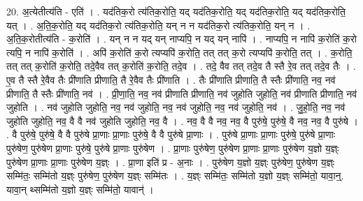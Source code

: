 \documentclass[17pt]{extarticle}
\begin{document}
20. अ॒त्येतीत्य॑ति - एति॑ । . यद॑तिक॒रो त्य॑तिक॒रोति॒ यद् यद॑तिक॒रोति॒ यद् यद॑तिक॒रोति॒ यद् यद॑तिक॒रोति॒ यत् । . अ॒ति॒क॒रोति॒ यद् यद॑तिक॒रो त्य॑तिक॒रोति॒ यन् न न यद॑तिक॒रो त्य॑तिक॒रोति॒ यन् न । . अ॒ति॒क॒रोतीत्य॑ति - क॒रोति॑ । . यन् न न यद् यन् नाप्यपि॒ न यद् यन् नापि॑ । . नाप्यपि॒ न नापि॑ क॒रोति॑ क॒रो त्यपि॒ न नापि॑ क॒रोति॑ । . अपि॑ क॒रोति॑ क॒रो त्यप्यपि॑ क॒रोति॒ तत् तत् क॒रो त्यप्यपि॑ क॒रोति॒ तत् । . क॒रोति॒ तत् तत् क॒रोति॑ क॒रोति॒ तदे॒वैव तत् क॒रोति॑ क॒रोति॒ तदे॒व । . तदे॒ वैव तत् तदे॒व तै स्तै रे॒व तत् तदे॒व तैः । . ए॒व तै स्तै रे॒वैव तैः प्री॑णाति प्रीणाति॒ तै रे॒वैव तैः प्री॑णाति । . तैः प्री॑णाति प्रीणाति॒ तै स्तैः प्री॑णाति॒ नव॒ नव॑ प्रीणाति॒ तै स्तैः प्री॑णाति॒ नव॑ । . प्री॒णा॒ति॒ नव॒ नव॑ प्रीणाति प्रीणाति॒ नव॑ जुहोति जुहोति॒ नव॑ प्रीणाति प्रीणाति॒ नव॑ जुहोति । . नव॑ जुहोति जुहोति॒ नव॒ नव॑ जुहोति॒ नव॒ नव॑ जुहोति॒ नव॒ नव॑ जुहोति॒ नव॑ । . जु॒हो॒ति॒ नव॒ नव॑ जुहोति जुहोति॒ नव॒ वै वै नव॑ जुहोति जुहोति॒ नव॒ वै । . नव॒ वै वै नव॒ नव॒ वै पुरु॑षे॒ पुरु॑षे॒ वै नव॒ नव॒ वै पुरु॑षे । . वै पुरु॑षे॒ पुरु॑षे॒ वै वै पुरु॑षे प्रा॒णाः प्रा॒णाः पुरु॑षे॒ वै वै पुरु॑षे प्रा॒णाः । . पुरु॑षे प्रा॒णाः प्रा॒णाः पुरु॑षे॒ पुरु॑षे प्रा॒णाः पुरु॑षेण॒ पुरु॑षेण प्रा॒णाः पुरु॑षे॒ पुरु॑षे प्रा॒णाः पुरु॑षेण । . प्रा॒णाः पुरु॑षेण॒ पुरु॑षेण प्रा॒णाः प्रा॒णाः पुरु॑षेण य॒ज्ञो य॒ज्ञ्ः पुरु॑षेण प्रा॒णाः प्रा॒णाः पुरु॑षेण य॒ज्ञ्ः । . प्रा॒णा इति॑ प्र - अ॒नाः । . पुरु॑षेण य॒ज्ञो य॒ज्ञ्ः पुरु॑षेण॒ पुरु॑षेण य॒ज्ञ्ः सम्मि॑तः॒ सम्मि॑तो य॒ज्ञ्ः पुरु॑षेण॒ पुरु॑षेण य॒ज्ञ्ः सम्मि॑तः । . य॒ज्ञ्ः सम्मि॑तः॒ सम्मि॑तो य॒ज्ञो य॒ज्ञ्ः सम्मि॑तो॒ यावा॒न्॒. यावा॒न् थ्सम्मि॑तो य॒ज्ञो य॒ज्ञ्ः सम्मि॑तो॒ यावान्॑ । \newline
\end{document}
